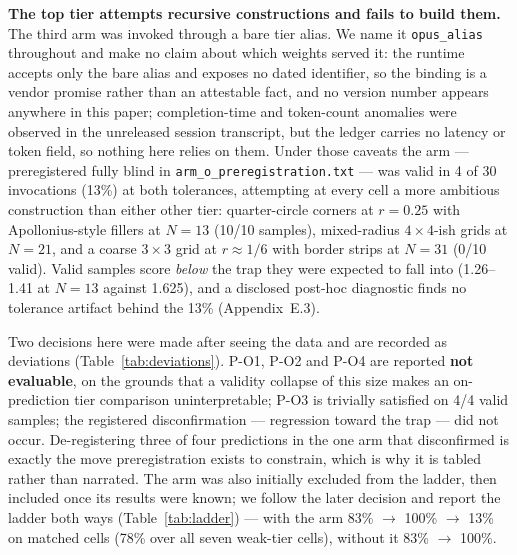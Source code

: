 \textbf{The top tier attempts recursive constructions and fails to build them.} The third arm was
invoked through a bare tier alias. We name it \texttt{opus\_alias} throughout and make no claim
about which weights served it: the runtime accepts only the bare alias and exposes no dated
identifier, so the binding is a vendor promise rather than an attestable fact, and no version
number appears anywhere in this paper; completion-time and token-count anomalies were observed in
the unreleased session transcript, but the ledger carries no latency or token field, so nothing
here relies on them. Under those caveats the arm --- preregistered fully blind in
\texttt{arm\_o\_preregistration.txt} --- was valid in 4 of 30 invocations (13\%) at both tolerances,
attempting at every cell a more ambitious construction than either other tier: quarter-circle
corners at $r = 0.25$ with Apollonius-style fillers at $N = 13$ (10/10 samples), mixed-radius
$4 \times 4$-ish grids at $N = 21$, and a coarse $3 \times 3$ grid at $r \approx 1/6$ with border
strips at $N = 31$ (0/10 valid). Valid samples score \emph{below} the trap they were expected to
fall into (1.26--1.41 at $N = 13$ against 1.625), and a disclosed post-hoc diagnostic finds no
tolerance artifact behind the 13\% (Appendix~E.3).

Two decisions here were made after seeing the data and are recorded as deviations
(Table~\ref{tab:deviations}). P-O1, P-O2 and P-O4 are reported \textbf{not evaluable}, on the
grounds that a validity collapse of this size makes an on-prediction tier comparison
uninterpretable; P-O3 is trivially satisfied on 4/4 valid samples; the registered disconfirmation
--- regression toward the trap --- did not occur. De-registering three of four predictions in the
one arm that disconfirmed is exactly the move preregistration exists to constrain, which is why it
is tabled rather than narrated. The arm was also initially excluded from the ladder, then included
once its results were known; we follow the later decision and report the ladder both ways
(Table~\ref{tab:ladder}) --- with the arm 83\% $\rightarrow$ 100\% $\rightarrow$ 13\% on matched
cells (78\% over all seven weak-tier cells), without it 83\% $\rightarrow$ 100\%.

